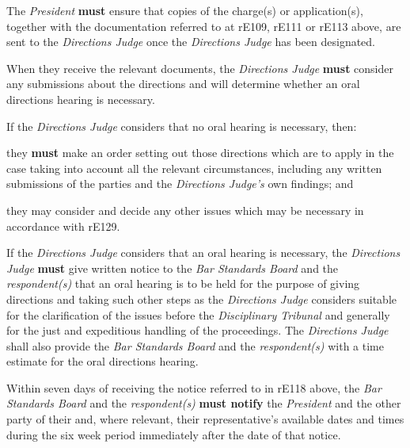 The \emph{President}  \textcolor{myred}{\textbf{must}} ensure that copies of the charge(s) or
application(s), together with the documentation referred to at rE109,
rE111 or rE113 above, are sent to the \emph{Directions Judge} once
the \emph{Directions Judge} has been designated.\\
\par
When they receive the relevant documents, the \emph{Directions
Judge}  \textcolor{myred}{\textbf{must}} consider any submissions about the directions and will
determine whether an oral directions hearing is necessary.\\
\par
If the \emph{Directions Judge} considers that no oral hearing is
necessary, then:\\\nl \item they  \textcolor{myred}{\textbf{must}} make an order setting out those directions which are to
apply in the case taking into account all the relevant circumstances,
including any written submissions of the parties and
the \emph{Directions Judge's} own findings; and\item they may consider and decide any other issues which may be necessary
in accordance with rE129.\ln
{}\par
If the \emph{Directions Judge} considers that an oral hearing is
necessary, the \emph{Directions Judge}  \textcolor{myred}{\textbf{must}} give written notice to
the \emph{Bar Standards Board} and the \emph{respondent(s) }that an oral
hearing is to be held for the purpose of giving directions and taking
such other steps as the \emph{Directions Judge }considers suitable for
the clarification of the issues before the \emph{Disciplinary
Tribunal} and generally for the just and expeditious handling of the
proceedings. The \emph{Directions Judge} shall also provide
the \emph{Bar Standards Board} and the \emph{respondent(s)} with a time
estimate for the oral directions hearing.\\
\par
Within seven days of receiving the notice referred to in rE118 above,
the \emph{Bar Standards Board} and the \emph{respondent(s)}  \textcolor{myred}{\textbf{must notify}} the \emph{President} and the other party of their and, where relevant,
their representative's available dates and times during the six week
period immediately after the date of that notice.\\
\par
